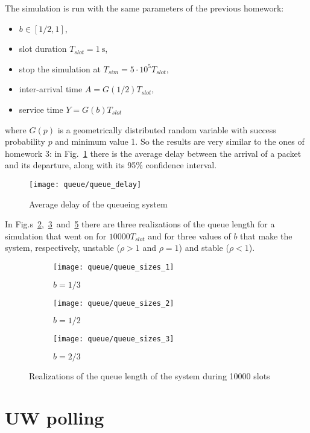 \documentclass[a4paper,oneside]{article}
\begin{document}
The simulation is run with the same parameters of the previous
homework:
\begin{itemize}
\item $ b \in [1/2, 1]$,
\item slot duration $T_{slot} = \SI{1}{\s}$,
\item stop the simulation at $T_{sim} = 5 \cdot 10^5 T_{slot}$,
\item inter-arrival time $A = G(1/2)T_{slot}$,
\item service time $Y = G(b)T_{slot}$
\end{itemize}
where $G(p)$ is a geometrically distributed random variable with
success probability $p$ and minimum value 1. So the results are very
similar to the ones of homework 3: in Fig.~\ref{plot:queue_delay}
there is the average delay between the arrival of a packet and its
departure, along with its 95\% confidence interval.
\begin{figure}[htbp]
  \centering
    \texttt{[image: queue/queue\_delay]}
    \caption{Average delay of the queueing system}
    \label{plot:queue_delay}
\end{figure}
In
Fig.s~\ref{plot:queue_sizes_unstable},~\ref{plot:queue_sizes_limit}~and~\ref{plot:queue_sizes_stable}
there are three realizations of the queue length for a simulation that
went on for $10000T_{slot}$ and for three values of $b$ that make the
system, respectively, unstable ($\rho > 1$ and $\rho = 1$) and stable
($\rho < 1$).
\begin{figure}[htbp]
  \centering
  \begin{subfigure}{0.5\textwidth}
    \centering
    \texttt{[image: queue/queue\_sizes\_1]}
    \caption{$ b = 1/3 $}
    \label{plot:queue_sizes_unstable}
  \end{subfigure}%
  \begin{subfigure}{0.5\textwidth}
    \centering
    \texttt{[image: queue/queue\_sizes\_2]}
    \caption{$ b = 1/2 $}
    \label{plot:queue_sizes_limit}
  \end{subfigure}
  \begin{subfigure}{0.5\textwidth}
    \centering
    \texttt{[image: queue/queue\_sizes\_3]}
    \caption{$ b = 2/3 $}
    \label{plot:queue_sizes_stable}
  \end{subfigure}
  \caption{Realizations of the queue length of the system during 10000 slots}
\end{figure}

\section{UW polling}
\end{document}
